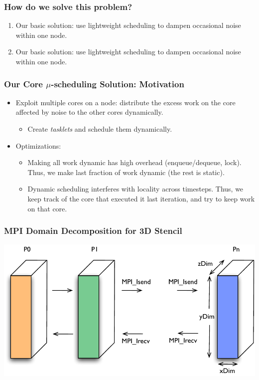 \begin{frame}
\frametitle{How do we solve this problem?} 
\begin{enumerate} 
\item \small Our basic solution: use lightweight scheduling to dampen occasional noise within one node. 
\item \small Our basic solution: use lightweight scheduling to dampen occasional noise within one node. 
\end{enumerate} 
\end{frame} 


\begin{frame}
\frametitle{Our Core $\mu$-scheduling Solution: Motivation}
\begin{itemize}
\item Exploit multiple cores on a node: distribute the excess work on
the core affected by noise to the other cores dynamically.
\begin{itemize}
\item {\small Create \textit{tasklets} and schedule them dynamically.}
\end{itemize}
\item Optimizations:
\begin{itemize}
\item {\small Making all work dynamic has high overhead
 (enqueue/dequeue, lock). Thus, we make last fraction
of work dynamic (the rest is static).}
\item {\small Dynamic scheduling interferes with locality across timesteps.
Thus, we keep track of the core that executed it last iteration, and try to keep work on that core. }
\end{itemize}
\end{itemize}
\end{frame}

\begin{frame}
\frametitle{MPI Domain Decomposition for 3D Stencil}
\includegraphics[width=\textwidth]{images/mpi_decomp}
\end{frame}

